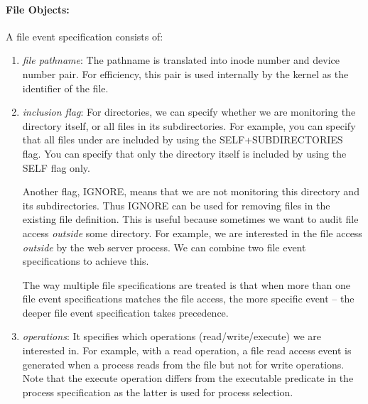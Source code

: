 

\paragraph{File Objects:}
A file event specification consists of:

\begin{enumerate}

\item {\em file pathname}:
The pathname is translated into inode number and device number pair.
For efficiency, this pair is used internally by the kernel as
the identifier of the file.

\item {\em inclusion flag}:
For directories, we can specify whether
we are monitoring the directory itself, or all files in its subdirectories.
For example, you can specify that all files under 
are included by using the SELF+SUBDIRECTORIES flag.
You can specify that only the  directory itself
is included by using the SELF flag only.

Another flag, IGNORE, means that we
are not monitoring this directory and its subdirectories.
Thus IGNORE can be used for removing files in the existing file definition.
This is useful because sometimes we want to audit file access
{\em outside} some directory.
For example, we are interested in the file access {\em outside}
 by the web server process.
We can combine two file event specifications to achieve this.

The way multiple file specifications are treated is that when
more than one file event specifications matches the file access,
the more specific event -- 
the deeper file event specification takes precedence.

\item {\em operations}:
It specifies which operations (read/write/execute) we are interested in.
For example, with a read operation, a file read access event
is generated when a process reads from the file but not for write operations.
Note that the execute operation differs from the executable 
predicate in the process specification as the latter is used for process
selection.


\end{enumerate}
